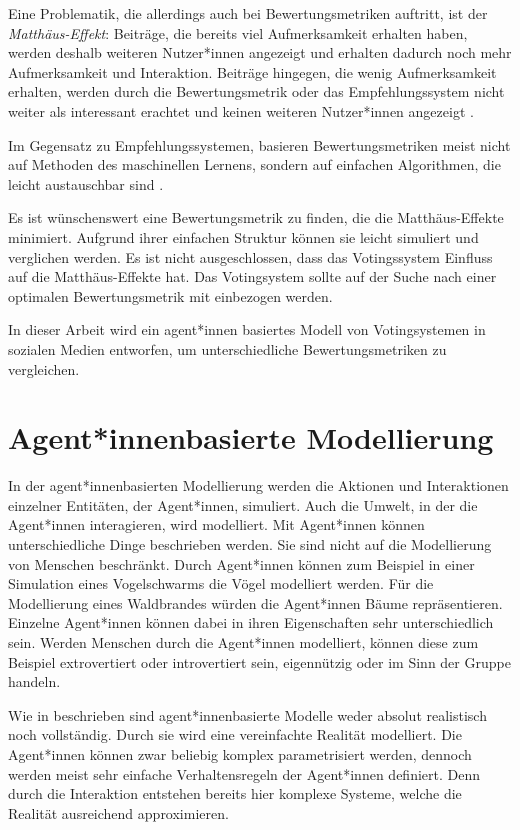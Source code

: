 Eine Problematik, die allerdings auch bei Bewertungsmetriken auftritt, ist der \textit{Matthäus-Effekt}: Beiträge, die bereits viel Aufmerksamkeit erhalten haben, werden deshalb weiteren Nutzer*innen angezeigt und erhalten dadurch noch mehr Aufmerksamkeit und Interaktion. Beiträge hingegen, die wenig Aufmerksamkeit erhalten, werden durch die Bewertungsmetrik oder das Empfehlungssystem nicht weiter als interessant erachtet und keinen weiteren Nutzer*innen angezeigt \cite{Stoddard2015416}.

Im Gegensatz zu Empfehlungssystemen, basieren Bewertungsmetriken meist nicht auf Methoden des maschinellen Lernens, sondern auf einfachen Algorithmen, die leicht austauschbar sind \cite{Adomavicius2005734}.

Es ist wünschenswert eine Bewertungsmetrik zu finden, die die Matthäus-Effekte minimiert. Aufgrund ihrer einfachen Struktur können sie leicht simuliert und verglichen werden. Es ist nicht ausgeschlossen, dass das Votingssystem Einfluss auf die Matthäus-Effekte hat. Das Votingsystem sollte auf der Suche nach einer optimalen Bewertungsmetrik mit einbezogen werden.

In dieser Arbeit wird ein agent*innen basiertes Modell von Votingsystemen in sozialen Medien entworfen, um unterschiedliche Bewertungsmetriken zu vergleichen.

\section{Agent*innenbasierte Modellierung}

In der agent*innenbasierten Modellierung werden die Aktionen und Interaktionen einzelner Entitäten, der Agent*innen, simuliert. Auch die Umwelt, in der die Agent*innen interagieren, wird modelliert. Mit Agent*innen können unterschiedliche Dinge beschrieben werden. Sie sind nicht auf die Modellierung von Menschen beschränkt. Durch Agent*innen können zum Beispiel in einer Simulation eines Vogelschwarms die Vögel modelliert werden. Für die Modellierung eines Waldbrandes würden die Agent*innen Bäume repräsentieren. Einzelne Agent*innen können dabei in ihren Eigenschaften sehr unterschiedlich sein. Werden Menschen durch die Agent*innen modelliert, können diese zum Beispiel extrovertiert oder introvertiert sein, eigennützig oder im Sinn der Gruppe handeln.


Wie in \cite{Burbach20203} beschrieben sind agent*innenbasierte Modelle weder absolut realistisch noch vollständig. Durch sie wird eine vereinfachte Realität modelliert. Die Agent*innen können zwar beliebig komplex parametrisiert werden, dennoch werden meist sehr einfache Verhaltensregeln der Agent*innen definiert. Denn durch die Interaktion entstehen bereits hier komplexe Systeme, welche die Realität ausreichend approximieren.

